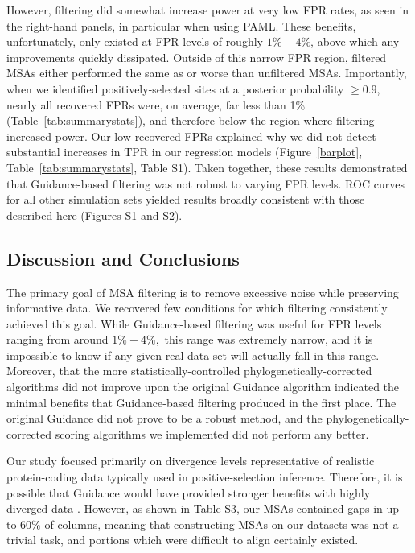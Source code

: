 \documentclass[11pt]{article}
\begin{document}
However, filtering did somewhat increase power at very low FPR rates, as seen in the right-hand panels, in particular when using PAML. These benefits, unfortunately, only existed at FPR levels of roughly $1\% - 4\%$, above which any improvements quickly dissipated. Outside of this narrow FPR region, filtered MSAs either performed the same as or worse than unfiltered MSAs. Importantly, when we identified positively-selected sites at a posterior probability $\geq 0.9$, nearly all recovered FPRs were, on average, far less than 1\% (Table~\ref{tab:summarystats}), and therefore below the region where filtering increased power. Our low recovered FPRs explained why we did not detect substantial increases in TPR in our regression models (Figure~\ref{barplot}, Table~\ref{tab:summarystats}, Table S1). Taken together, these results demonstrated that Guidance-based filtering was not robust to varying FPR levels. ROC curves for all other simulation sets yielded results broadly consistent with those described here (Figures S1 and S2).

\subsection*{Discussion and Conclusions}

The primary goal of MSA filtering is to remove excessive noise while preserving informative data. We recovered few conditions for which filtering consistently achieved this goal. While Guidance-based filtering was useful for FPR levels ranging from around $1\% - 4\%,$ this range was extremely narrow, and it is impossible to know if any given real data set will actually fall in this range. Moreover, that the more statistically-controlled phylogenetically-corrected algorithms did not improve upon the original Guidance algorithm indicated the minimal benefits that Guidance-based filtering produced in the first place. The original Guidance did not prove to be a robust method, and the phylogenetically-corrected scoring algorithms we implemented did not perform any better.

Our study focused primarily on divergence levels representative of realistic protein-coding data typically used in positive-selection inference. Therefore, it is possible that Guidance would have provided stronger benefits with highly diverged data \citep{Privman2012}. However, as shown in Table S3, our MSAs contained gaps in up to 60\% of columns, meaning that constructing MSAs on our datasets was not a trivial task, and portions which were difficult to align certainly existed.
\end{document}
